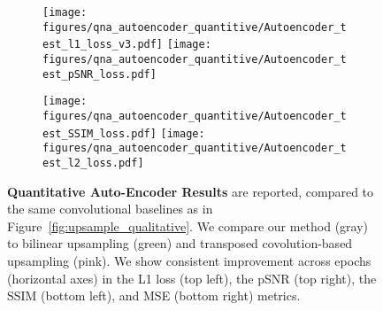 \begin{figure}
    \centering
    \begin{subfigure}{\linewidth}
        \centering
\texttt{[image: figures/qna\_autoencoder\_quantitive/Autoencoder\_test\_l1\_loss\_v3.pdf]}
        \texttt{[image: figures/qna\_autoencoder\_quantitive/Autoencoder\_test\_pSNR\_loss.pdf]}
\end{subfigure}
        \begin{subfigure}{\linewidth}
        \centering
        \texttt{[image: figures/qna\_autoencoder\_quantitive/Autoencoder\_test\_SSIM\_loss.pdf]}
        \texttt{[image: figures/qna\_autoencoder\_quantitive/Autoencoder\_test\_l2\_loss.pdf]}
\end{subfigure}
    \caption{\textbf{Quantitative Auto-Encoder Results} are reported, compared to the same convolutional baselines as in Figure~\ref{fig:upsample_qualitative}. We compare our method (gray) to bilinear upsampling (green) and transposed covolution-based upsampling (pink). We show consistent improvement across epochs (horizontal axes) in the L1 loss (top left), the pSNR (top right), the SSIM (bottom left), and MSE (bottom right) metrics. 
}
    \label{fig:upsample_quantitative}
\end{figure} 